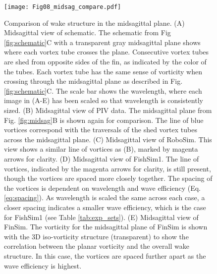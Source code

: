 \documentclass[onecolumn]{IEEEtran}
\begin{document}
\begin{figure}
\centering
\texttt{[image: Fig08\_midsag\_compare.pdf]}
\caption{ Comparison of wake structure in the midsagittal plane.
(A) Midsagittal view of schematic.  The schematic from Fig \ref{fig:schematic}C with a transparent gray
midsagittal plane shows where each vortex tube crosses the plane.
Consecutive vortex tubes are shed from opposite sides of the fin, as
indicated by the color of the tubes. Each vortex tube has the
same sense of vorticity when crossing through the midsagittal plane as described in Fig. \ref{fig:schematic}C. The
scale bar shows the wavelength, where each image in (A-E) has been scaled
so that wavelength is consistently sized.
(B) Midsagittal view of PIV data. The midsagittal plane from Fig. \ref{fig:midsag}B is shown again for
comparison. The line of blue vortices correspond with the traversals of
the shed vortex tubes across the midsagittal plane.
(C) Midsagittal view of RoboSim. This view shows a similar line of
vortices as (B), marked by magenta arrows for clarity.
(D) Midsagittal view of FishSim1. The line of vortices, indicated by 
the magenta arrows for clarity, is still present, though the vortices are
spaced more closely together. The spacing of the vortices is dependent on
wavelength and wave efficiency (Eq. \ref{eq:spacing}). As wavelength is scaled
the same across each case, a closer spacing indicates a smaller wave
efficiency, which is the case for FishSim1 (see Table \ref{tab:exp_sets}).
(E) Midsagittal view of FinSim. The vorticity for the midsagittal plane of FinSim is shown with the 3D
iso-vorticity structure (transparent) to show the correlation between the
planar vorticity and the overall wake structure. In this case, the
vortices are spaced further apart as the wave efficiency is highest.
 }
\label{fig:mid_compare}
\end{figure}
\clearpage
\newpage
\end{document}
